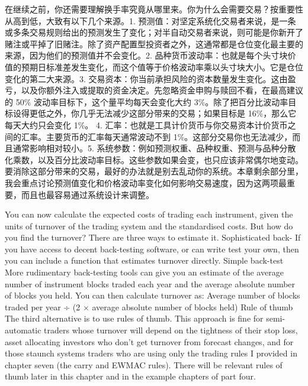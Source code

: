 \begin{chineseblock}在继续之前，你还需要理解换手率究竟从哪里来。你为什么会需要交易？按重要性从高到低，大致有以下几个来源。1. 预测值：对坚定系统化交易者来说，是一条或多条交易规则给出的预测发生了变化；对半自动交易者来说，则可能是你新开了赌注或平掉了旧赌注。除了资产配置型投资者之外，这通常都是仓位变化最主要的来源，因为他们的预测值并不会变化。2. 品种货币波动率：也就是每个头寸块价值的预期日标准差发生变化，而这个值等于价格波动率乘以头寸块大小。它是仓位变化的第二大来源。3. 交易资本：你当前承担风险的资本数量发生变化。这由盈亏，以及你额外注入或提取的资金决定。先忽略资金申购与赎回不看，在最高建议的 50\% 波动率目标下，这个量平均每天会变化大约 3\%。除了把百分比波动率目标设得更低之外，你几乎无法减少这部分带来的交易；如果目标是 16\%，那么它每天大约只会变化 1\%。 4. 汇率：也就是工具计价货币与你交易资本计价货币之间的汇率。主要货币的汇率每天通常波动不到 1\%。这部分交易你也无法减少，而且通常影响相对较小。5. 系统参数：例如预测权重、品种权重、预测与品种分散化乘数，以及百分比波动率目标。这些参数如果会变，也只应该非常偶尔地变动。要消除这部分带来的交易，最好的办法就是别去乱动你的系统。本章剩余部分里，我会重点讨论预测值变化和价格波动率变化如何影响交易速度，因为这两项最重要，而且也最容易通过系统设计来调整。\end{chineseblock}


\begin{englishblock} You can now calculate the expected costs of trading each instrument, given the units of turnover of the trading system and the standardised costs. But how do you find the turnover? There are three ways to estimate it. Sophisticated back- If you have access to decent back-testing software, or can write test your own, then you can include a function that estimates turnover directly. Simple back-test More rudimentary back-testing tools can give you an estimate of the average number of instrument blocks traded each year and the average absolute number of blocks you held. You can then calculate turnover as: Average number of blocks traded per year ÷ (2 × average absolute number of blocks held) Rule of thumb The third alternative is to use rules of thumb. This approach is fine for semi-automatic traders whose turnover will depend on the tightness of their stop loss, asset allocating investors who don't get turnover from forecast changes, and for those staunch systems traders who are using only the trading rules I provided in chapter seven (the carry and EWMAC rules). There will be relevant rules of thumb later in this chapter and in the example chapters of part four. \end{englishblock}

